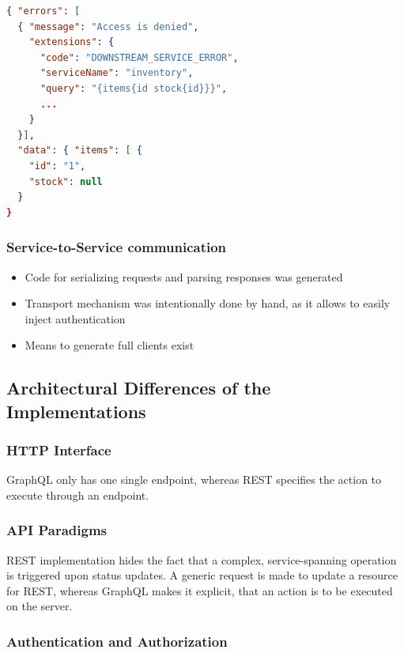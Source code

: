 \begin{lstlisting}[caption={Response to an Unauthorzed Query}, language=json, label={lst:gql-resp-unauthorized}]
{ "errors": [
  { "message": "Access is denied",
    "extensions": { 
      "code": "DOWNSTREAM_SERVICE_ERROR",
      "serviceName": "inventory",
      "query": "{items{id stock{id}}}",
      ...
    }
  }],
  "data": { "items": [ {
    "id": "1",
    "stock": null
  }
}
\end{lstlisting}

\subsubsection{Service-to-Service communication}

\begin{itemize}
    \item Code for serializing requests and parsing responses was generated
    \item Transport mechanism was intentionally done by hand, as it allows to easily inject authentication
    \item Means to generate full clients exist
\end{itemize}

\subsection{Architectural Differences of the Implementations}

\subsubsection{\acs{HTTP} Interface}

GraphQL only has one single endpoint, whereas REST specifies the action to execute through an endpoint.

\subsubsection{\acs{API} Paradigms}

REST implementation hides the fact that a complex, service-spanning operation is triggered upon status updates.
A generic request is made to update a resource for REST, whereas GraphQL makes it explicit, that an action is to be executed on the server.

\subsubsection{Authentication and Authorization}

